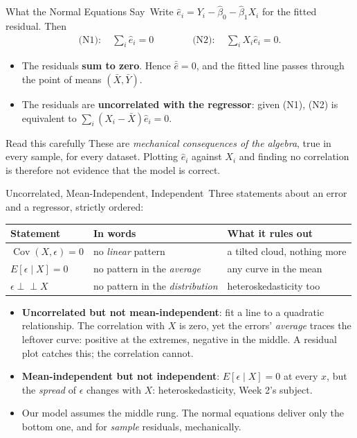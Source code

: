\documentclass[aspectratio=169,11pt,xcolor=dvipsnames]{beamer}
\DeclareMathOperator{\Cov}{Cov}
\newcommand{\indep}{\perp\!\!\!\perp}
\newcommand{\E}{E}
\newcommand{\core}{\,\raisebox{0.6pt}{\textcolor{corestar}{$\bigstar$}}}
\begin{document}
\begin{frame}{What the Normal Equations Say\core}
Write $\hat e_i = Y_i - \hat\beta_0 - \hat\beta_1 X_i$ for the fitted residual. Then
\begin{align*}
  \text{(N1)}: \quad \sum_i \hat e_i = 0
  \qquad\qquad
  \text{(N2)}: \quad \sum_i X_i \hat e_i = 0 .
\end{align*}
\begin{itemize}\itemsep5pt
  \item The residuals \textbf{sum to zero}. Hence $\bar{\hat e} = 0$, and the
        fitted line passes through the point of means $(\bar X, \bar Y)$.
  \item The residuals are \textbf{uncorrelated with the regressor}: given (N1),
        (N2) is equivalent to $\sum_i (X_i - \bar X)\hat e_i = 0$.
\end{itemize}
\vskip4pt
\begin{alertblock}{Read this carefully}
These are \emph{mechanical consequences of the algebra}, true in every sample,
for every dataset. Plotting $\hat e_i$ against $X_i$ and finding no correlation
is therefore \alert{not evidence that the model is correct}.
\end{alertblock}
\end{frame}

\begin{frame}{Uncorrelated, Mean-Independent, Independent\core}
Three statements about an error and a regressor, strictly ordered:
\begin{center}\small
\renewcommand{\arraystretch}{1.15}
\begin{tabular}{lll}
\toprule
Statement & In words & What it rules out \\
\midrule
$\Cov(X,\epsilon) = 0$ & no \emph{linear} pattern & a tilted cloud, nothing more \\
$\E[\epsilon\mid X] = 0$ & no pattern in the \emph{average} & any curve in the mean \\
$\epsilon \indep X$ & no pattern in the \emph{distribution} & heteroskedasticity too \\
\bottomrule
\end{tabular}
\end{center}
\vskip2pt
\begin{itemize}\itemsep2pt
  \item \textbf{Uncorrelated but not mean-independent}: fit a line to a
        quadratic relationship. The correlation with $X$ is zero, yet the
        errors' \emph{average} traces the leftover curve: positive at the
        extremes, negative in the middle. A residual plot catches this; the
        correlation cannot.
  \item \textbf{Mean-independent but not independent}: $\E[\epsilon\mid X]=0$
        at every $x$, but the \emph{spread} of $\epsilon$ changes with $X$:
        heteroskedasticity, Week 2's subject.
  \item Our model assumes the middle rung. The normal equations deliver only
        the bottom one, and for \emph{sample} residuals, mechanically.
\end{itemize}
\end{frame}
\end{document}
